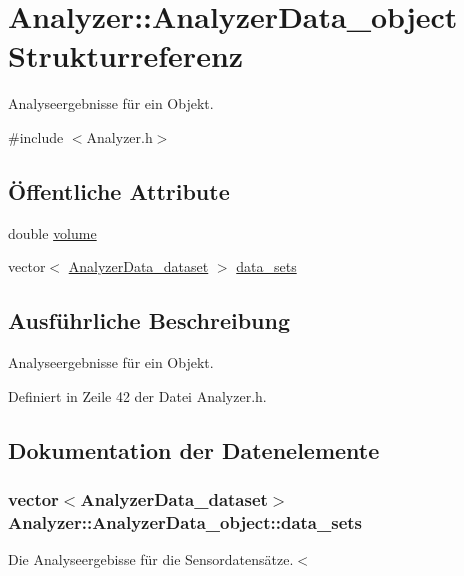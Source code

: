 \hypertarget{structAnalyzer_1_1AnalyzerData__object}{\section{Analyzer\-:\-:Analyzer\-Data\-\_\-object Strukturreferenz}
\label{structAnalyzer_1_1AnalyzerData__object}
}


Analyseergebnisse für ein Objekt.  




{\ttfamily \#include $<$Analyzer.\-h$>$}

\subsection*{Öffentliche Attribute}
\begin{DoxyCompactItemize}
\item 
double \hyperlink{structAnalyzer_1_1AnalyzerData__object_a78ddeb311ff702e110fc1d483d826920}{volume}
\item 
vector$<$ \hyperlink{structAnalyzer_1_1AnalyzerData__dataset}{Analyzer\-Data\-\_\-dataset} $>$ \hyperlink{structAnalyzer_1_1AnalyzerData__object_a5d36dcf805f37b0e29134236e3881fca}{data\-\_\-sets}
\end{DoxyCompactItemize}


\subsection{Ausführliche Beschreibung}
Analyseergebnisse für ein Objekt. 

Definiert in Zeile 42 der Datei Analyzer.\-h.



\subsection{Dokumentation der Datenelemente}
\hypertarget{structAnalyzer_1_1AnalyzerData__object_a5d36dcf805f37b0e29134236e3881fca}{
\subsubsection[{data\-\_\-sets}]{\setlength{\rightskip}{0pt plus 5cm}vector$<${\bf Analyzer\-Data\-\_\-dataset}$>$ Analyzer\-::\-Analyzer\-Data\-\_\-object\-::data\-\_\-sets}}\label{structAnalyzer_1_1AnalyzerData__object_a5d36dcf805f37b0e29134236e3881fca}
Die Analyseergebisse für die Sensordatensätze.$<$ 

